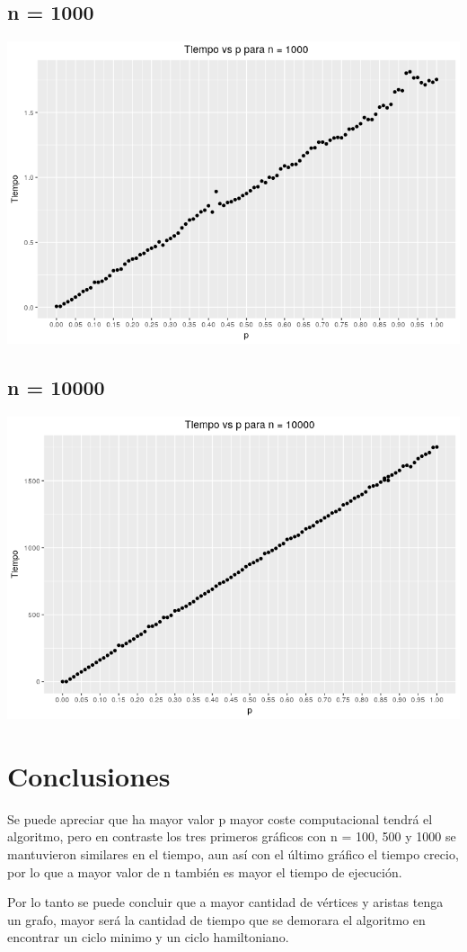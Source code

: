 \documentclass[12pt,letterpaper]{scrartcl}
\begin{document}
\subsection{n = 1000}
\begin{center}
\includegraphics[scale=.80]{plots/plot3n1000.png} 
\end{center}
\newpage
\subsection{n = 10000}
\begin{center}
\includegraphics[scale=.80]{plots/plot4n10000.png} 
\end{center}
\newpage
\section{Conclusiones}

Se puede apreciar que ha mayor valor p mayor coste computacional tendrá el algoritmo, pero en contraste los tres primeros gráficos con n = 100, 500 y 1000 se mantuvieron similares en el tiempo, aun así con el último gráfico el tiempo crecio, por lo que a mayor valor de n también es mayor el tiempo de ejecución.

Por lo tanto se puede concluir que a mayor cantidad de vértices y aristas tenga un grafo, mayor será la cantidad de tiempo que se demorara el algoritmo en encontrar un ciclo minimo y un ciclo hamiltoniano.
\end{document}
